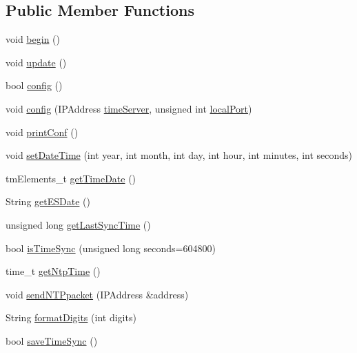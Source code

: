 \subsection*{Public Member Functions}
\begin{DoxyCompactItemize}
\item 
void \hyperlink{classCoolTime_ab1976cf718b950bc31e003c3323b8adb}{begin} ()
\item 
void \hyperlink{classCoolTime_aae601f795452cfa48d9fb337aed483a8}{update} ()
\item 
bool \hyperlink{classCoolTime_a87c28260c1bc77091162cbcf1ee2e129}{config} ()
\item 
void \hyperlink{classCoolTime_a014656d0d3f74d6391364b92b13e0780}{config} (I\+P\+Address \hyperlink{classCoolTime_ad2b9858f399108cb440dd1e908916f04}{time\+Server}, unsigned int \hyperlink{classCoolTime_a2f777da44d7ba678be8185299e9b49d1}{local\+Port})
\item 
void \hyperlink{classCoolTime_af355e7f9b3898211cd2ff25eab5933b1}{print\+Conf} ()
\item 
void \hyperlink{classCoolTime_ab81ea7fdaace111aa01cc1ec84c6d297}{set\+Date\+Time} (int year, int month, int day, int hour, int minutes, int seconds)
\item 
tm\+Elements\+\_\+t \hyperlink{classCoolTime_a7a7501c5ca77dd1248bea704c44f986c}{get\+Time\+Date} ()
\item 
String \hyperlink{classCoolTime_ac4f32ee513c1328d984306645e8785a4}{get\+E\+S\+Date} ()
\item 
unsigned long \hyperlink{classCoolTime_a5d17f707a9d337720493b2bce9d41c21}{get\+Last\+Sync\+Time} ()
\item 
bool \hyperlink{classCoolTime_a5ae038a4498602b189f76a10bf02adf8}{is\+Time\+Sync} (unsigned long seconds=604800)
\item 
time\+\_\+t \hyperlink{classCoolTime_a41fbbbfd651c2079f54d4b2911e4c705}{get\+Ntp\+Time} ()
\item 
void \hyperlink{classCoolTime_a236a38d120dc53bc67456d763838c5a1}{send\+N\+T\+Ppacket} (I\+P\+Address \&address)
\item 
String \hyperlink{classCoolTime_acd537cd4210d7bde4e1f5c47d2ac0456}{format\+Digits} (int digits)
\item 
bool \hyperlink{classCoolTime_ae9658c9b377510d469e3b88edf33ee85}{save\+Time\+Sync} ()
\end{DoxyCompactItemize}

